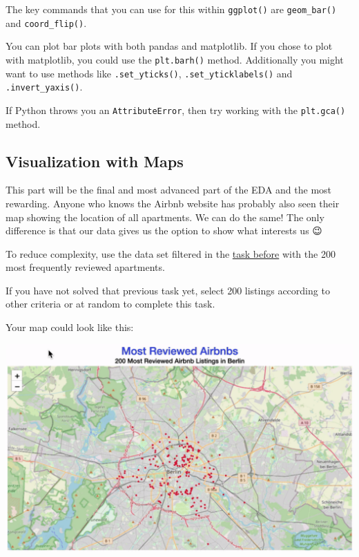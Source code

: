 \documentclass[
  11pt,
]{article}
\newenvironment{tips}[1]
  {
  \begin{itemize}
  \footnotesize
  \renewcommand{\labelitemi}{
    \raisebox{-.7\height}[0pt][0pt]{
      {\setkeys{Gin}{width=3em,keepaspectratio}
        \texttt{[image: images/\#1.png]}}
    }
  }
  \setlength{\fboxsep}{1em}
  \begin{rbox}
  \item
  }
  {
  \end{rbox}
  \end{itemize}
  }
\newenvironment{tipsp}[1]
  {
  \begin{itemize}
  \footnotesize
  \renewcommand{\labelitemi}{
    \raisebox{-.7\height}[0pt][0pt]{
      {\setkeys{Gin}{width=3em,keepaspectratio}
        \texttt{[image: images/\#1.png]}}
    }
  }
  \setlength{\fboxsep}{1em}
  \begin{pbox}
  \item
  }
  {
  \end{pbox}
  \end{itemize}
  }
\begin{document}
\begin{tips}r
The key commands that you can use for this within \texttt{ggplot()} are \texttt{geom\_bar()} and \texttt{coord\_flip()}.

\end{tips}

\begin{tipsp}p
You can plot bar plots with both pandas and matplotlib.
If you chose to plot with matplotlib, you could use the \texttt{plt.barh()} method.
Additionally you might want to use methods like \texttt{.set\_yticks()}, \texttt{.set\_yticklabels()} and \texttt{.invert\_yaxis()}.

If Python throws you an \texttt{AttributeError}, then try working with the \texttt{plt.gca()} method.

\end{tipsp}

\hypertarget{visualization-with-maps}{%
\subsection{Visualization with Maps}\label{visualization-with-maps}}

This part will be the final and most advanced part of the EDA and the most rewarding.
Anyone who knows the Airbnb website has probably also seen their map showing the location of all apartments.
We can do the same!
The only difference is that our data gives us the option to show what interests us 😉

To reduce complexity, use the data set filtered in the \href{https://tech-academy-ev.github.io/exploratory-data-analysis.html\#your-first-barplot}{task before} with the 200 most frequently reviewed apartments.

If you have not solved that previous task yet, select 200 listings according to other criteria or at random to complete this task.

Your map could look like this:

\begin{center}\includegraphics[width=1\linewidth]{plot/01_python/map_circles} \end{center}
\end{document}
